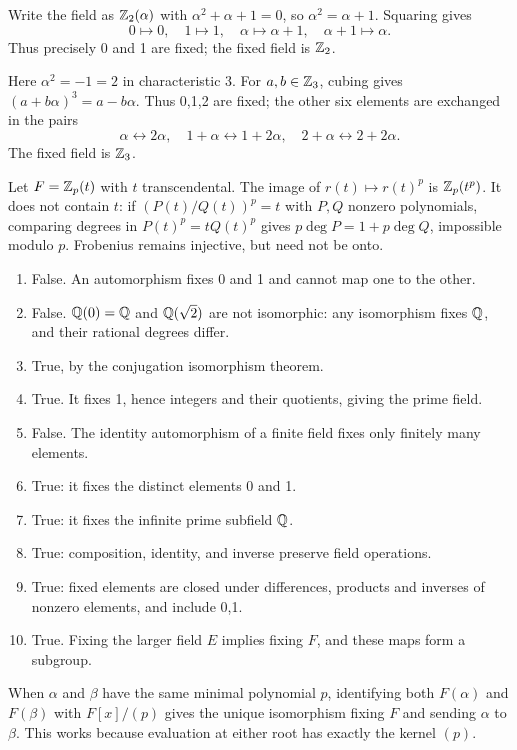 Write the field as $\mathbb{Z}_2(\alpha)$ with $\alpha^2+\alpha+1=0$, so $\alpha^2=\alpha+1$. Squaring gives
\[0\mapsto0,\quad1\mapsto1,\quad\alpha\mapsto\alpha+1,\quad\alpha+1\mapsto\alpha.\]
Thus precisely 0 and 1 are fixed; the fixed field is $\mathbb{Z}_2$.

Here $\alpha^2=-1=2$ in characteristic 3. For $a,b\in\mathbb{Z}_3$, cubing gives $(a+b\alpha)^3=a-b\alpha$. Thus 0,1,2 are fixed; the other six elements are exchanged in the pairs
\[\alpha\leftrightarrow2\alpha,\quad1+\alpha\leftrightarrow1+2\alpha,\quad2+\alpha\leftrightarrow2+2\alpha.\]
The fixed field is $\mathbb{Z}_3$.

Let $F=\mathbb{Z}_p(t)$ with $t$ transcendental. The image of $r(t)\mapsto r(t)^p$ is $\mathbb{Z}_p(t^p)$. It does not contain $t$: if $(P(t)/Q(t))^p=t$ with $P,Q$ nonzero polynomials, comparing degrees in $P(t)^p=tQ(t)^p$ gives $p\deg P=1+p\deg Q$, impossible modulo $p$. Frobenius remains injective, but need not be onto.

\begin{enumerate}[label=(\alph*)]
\item False. An automorphism fixes 0 and 1 and cannot map one to the other.
\item False. $\mathbb{Q}(0)=\mathbb{Q}$ and $\mathbb{Q}(\sqrt2)$ are not isomorphic: any isomorphism fixes $\mathbb{Q}$, and their rational degrees differ.
\item True, by the conjugation isomorphism theorem.
\item True. It fixes 1, hence integers and their quotients, giving the prime field.
\item False. The identity automorphism of a finite field fixes only finitely many elements.
\item True: it fixes the distinct elements 0 and 1.
\item True: it fixes the infinite prime subfield $\mathbb{Q}$.
\item True: composition, identity, and inverse preserve field operations.
\item True: fixed elements are closed under differences, products and inverses of nonzero elements, and include 0,1.
\item True. Fixing the larger field $E$ implies fixing $F$, and these maps form a subgroup.
\end{enumerate}

When $\alpha$ and $\beta$ have the same minimal polynomial $p$, identifying both $F(\alpha)$ and $F(\beta)$ with $F[x]/(p)$ gives the unique isomorphism fixing $F$ and sending $\alpha$ to $\beta$. This works because evaluation at either root has exactly the kernel $(p)$.

